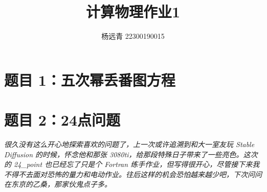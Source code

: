\documentclass[11pt]{article}
\author{杨远青 22300190015}
\title{计算物理作业1}
\begin{document}
\maketitle

\section{题目 1：五次幂丢番图方程}


\section{题目 2：24点问题}

\vspace{5pt}
\textit{很久没有这么开心地探索喜欢的问题了，上一次或许追溯到和大一室友玩 Stable Diffusion 的时候，怀念他和那张 3080ti，给那段特殊日子带来了一些亮色。这次的 24\_point 也已经忘了只是个 Fortran 练手作业，但写得很开心，尽管接下来我不得不去面对恐怖的量力和电动作业。往后这样的机会恐怕越来越少吧，下次问问在东京的乙桑，那家伙鬼点子多。}
\end{document}
